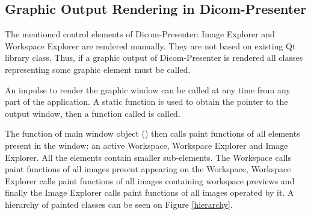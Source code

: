 \subsection{Graphic Output Rendering in Dicom-Presenter}
\label{renderingprocess}
The mentioned control elements of Dicom-Presenter: Image Explorer and Workspace Explorer are rendered manually. They are not based on existing Qt library class. Thus, if a graphic output of Dicom-Presenter is rendered all classes representing some graphic element must be called. 

An impulse to render the graphic window can be called at any time from any part of the application. A static function is used to obtain the pointer to the output window, then a function called  is called.

The  function of main window object () then calls paint functions of all elements present in the window: an active Workspace, Workspace Explorer and Image Explorer. All the elements contain smaller sub-elements. The Workspace calls paint functions of all images present appearing on the Workspace, Workspace Explorer calls paint functions of all images containing workspace previews and finally the Image Explorer calls paint functions of all images operated by it. A hierarchy of painted classes can be seen on Figure \ref{hierarchy}.

